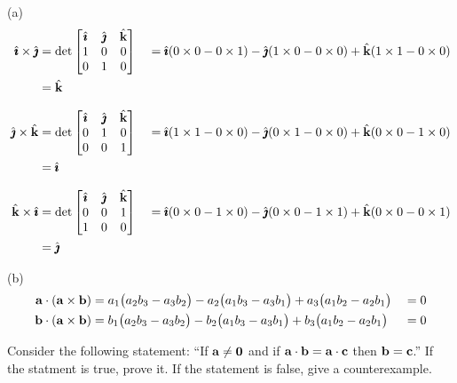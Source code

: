 \begin{solution}
(a)
\begin{alignat*}{5}
\hat{\pmb{\imath}}\times\hat{\pmb{\jmath}}&=\det\left[\begin{matrix}\hat{\pmb{\imath}}&\hat{\pmb{\jmath}} &\hat{\mathbf{k}}\\
                     1&0&0\\
                     0&1&0\end{matrix}\right]
&&=\hat{\pmb{\imath}}(0\times 0-0\times 1)
-\hat{\pmb{\jmath}}(1\times 0-0\times 0)
+\hat{\mathbf{k}}(1\times 1-0\times 0) \\
&=\hat{\mathbf{k}}\\[0.1in]
\hat{\pmb{\jmath}}\times\hat{\mathbf{k}}&=\det\left[\begin{matrix}\hat{\pmb{\imath}}&\hat{\pmb{\jmath}} &\hat{\mathbf{k}}\\
                     0&1&0\\
                     0&0&1\end{matrix}\right]
&&=\hat{\pmb{\imath}}(1\times 1-0\times 0)
-\hat{\pmb{\jmath}}(0\times 1-0\times 0)
+\hat{\mathbf{k}}(0\times 0-1\times 0)\\
&=\hat{\pmb{\imath}}\\[0.1in]
\hat{\mathbf{k}}\times\hat{\pmb{\imath}}&=\det\left[\begin{matrix}\hat{\pmb{\imath}}&\hat{\pmb{\jmath}} &\hat{\mathbf{k}}\\
                     0&0&1\\
                     1&0&0\end{matrix}\right]
&&=\hat{\pmb{\imath}}(0\times 0-1\times 0)
-\hat{\pmb{\jmath}}(0\times 0-1\times 1)
+\hat{\mathbf{k}}(0\times 0-0\times 1)\\
&=\hat{\pmb{\jmath}}
\end{alignat*}

(b)
\begin{alignat*}{5}
\mathbf{a}\cdot(\mathbf{a}\times\mathbf{b})
&=a_1\big(a_2b_3-a_3b_2\big)
  -a_2\big(a_1b_3-a_3b_1\big)
  +a_3\big(a_1b_2-a_2b_1\big)
&&=0\\
\mathbf{b}\cdot(\mathbf{a}\times\mathbf{b})
&=b_1\big(a_2b_3-a_3b_2\big)
  -b_2\big(a_1b_3-a_3b_1\big)
  +b_3\big(a_1b_2-a_2b_1\big)
&&=0
\end{alignat*}
\end{solution}




\begin{question}
Consider the following statement: ``If $\mathbf{a}\ne\mathbf{0}$
and if $\mathbf{a}\cdot\mathbf{b}=\mathbf{a}\cdot\mathbf{c}$ then $\mathbf{b}=\mathbf{c}$.''
If the statment is true, prove it. If the statement is false, give a 
counterexample.
\end{question}

%

